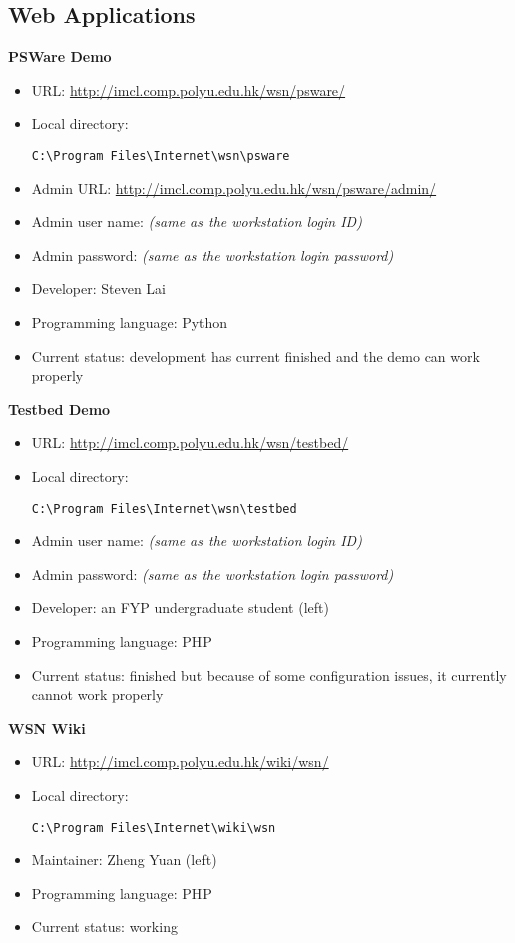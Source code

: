 \subsection{Web Applications}
\textbf{PSWare Demo}
\begin{itemize}
\item URL: \url{http://imcl.comp.polyu.edu.hk/wsn/psware/}
\item Local directory: \begin{verbatim}C:\Program Files\Internet\wsn\psware\end{verbatim}
\item Admin URL: \url{http://imcl.comp.polyu.edu.hk/wsn/psware/admin/}
\item Admin user name: \emph{(same as the workstation login ID)}
\item Admin password: \emph{(same as the workstation login password)}
\item Developer: Steven Lai
\item Programming language: Python
\item Current status: development has current finished and the demo can work properly
\end{itemize}
\textbf{Testbed Demo}
\begin{itemize}
\item URL: \url{http://imcl.comp.polyu.edu.hk/wsn/testbed/}
\item Local directory: \begin{verbatim}C:\Program Files\Internet\wsn\testbed\end{verbatim}
\item Admin user name: \emph{(same as the workstation login ID)}
\item Admin password: \emph{(same as the workstation login password)}
\item Developer: an FYP undergraduate student (left)
\item Programming language: PHP
\item Current status: finished but because of some configuration issues, it currently cannot work properly
\end{itemize}
\textbf{WSN Wiki}
\begin{itemize}
\item URL: \url{http://imcl.comp.polyu.edu.hk/wiki/wsn/}
\item Local directory: \begin{verbatim}C:\Program Files\Internet\wiki\wsn\end{verbatim}
\item Maintainer: Zheng Yuan (left)
\item Programming language: PHP
\item Current status: working
\end{itemize}
